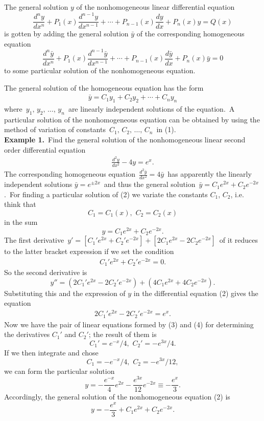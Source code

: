 \documentclass[12pt]{article}
\theoremstyle{definition}
\begin{document}
The general solution $y$ of the nonhomogeneous linear differential equation 
$$\frac{d^{n}y}{dx^n}+P_1(x)\frac{d^{n-1}y}{dx^{n-1}}+\cdots+
P_{n-1}(x)\frac{dy}{dx}+P_n(x)y = Q(x)$$
is gotten by adding the general solution $\bar{y}$ of the corresponding homogeneous equation 
$$\frac{d^{n}\bar{y}}{dx^n}+P_1(x)\frac{d^{n-1}\bar{y}}{dx^{n-1}}+\cdots+
P_{n-1}(x)\frac{d\bar{y}}{dx}+P_n(x)\bar{y} = 0$$
to some particular solution of the nonhomogeneous equation.

The general solution of the homogeneous equation has the form
\begin{align}
    \bar{y} = C_1y_1+C_2y_2+\cdots+C_ny_n
\end{align}
where\, $y_1,\,y_2,\,\ldots,\,y_n$\, are linearly independent solutions of the equation.\, A particular solution of the nonhomogeneous equation can be obtained by using the method of variation of constants\, $C_1,\,C_2,\,\ldots,\,C_n$\, in (1). \\

\textbf{Example 1.}\, Find the general solution of the nonhomogeneous linear second order differential equation
\begin{align}
   \frac{d^2y}{dx^2}-4y = e^x.
\end{align}
The corresponding homogeneous equation \,$\displaystyle\frac{d^2\bar{y}}{dx^2} = 4\bar{y}$\,
has apparently the linearly independent solutions $\bar{y} = e^{\pm2x}$\, and thus the general solution\,  $\bar{y} = C_1e^{2x}+C_2e^{-2x}$.\, For finding a particular solution of (2) we variate the constants $C_1$, $C_2$, i.e. think that 
$$C_1 = C_1(x),\,\,C_2 = C_2(x)$$
in the sum
$$y = C_1e^{2x}+C_2e^{-2x}.$$
The first derivative \,$y' = [C_1'e^{2x}+C_2'e^{-2x}]+[2C_1e^{2x}-2C_2e^{-2x}]$\, of it reduces to
the latter bracket expression if we set the condition 
\begin{align}
C_1'e^{2x}+C_2'e^{-2x} = 0.
\end{align}
So the second derivative is
$$y'' = (2C_1'e^{2x}-2C_2'e^{-2x})+(4C_1e^{2x}+4C_2e^{-2x}).$$
Substituting this and the expression of $y$ in the differential equation (2) gives the  equation
\begin{align}
2C_1'e^{2x}-2C_2'e^{-2x} = e^x.
\end{align}
Now we have the pair of linear equations formed by (3) and (4) for determining the derivatives $C_1'$ and $C_2'$; the result of them is
$$C_1' = e^{-x}/4,\,\,C_2' = -e^{3x}/4.$$
If we then integrate and chose 
$$C_1 = -e^{-x}/4,\,\,C_2 = -e^{3x}/12,$$
we can form the particular solution
$$y = -\frac{e^{-x}}{4}e^{2x}-\frac{e^{3x}}{12}e^{-2x} 
\equiv -\frac{e^x}{3}.$$
Accordingly, the general solution of the nonhomogeneous equation (2) is
$$ y = -\frac{e^x}{3}+C_1e^{2x}+C_2e^{-2x}.$$
\end{document}
